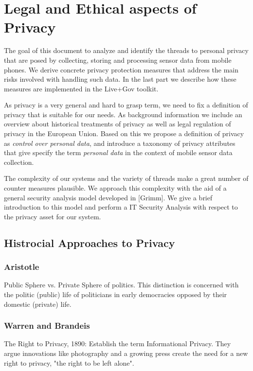 \chapter{Legal and Ethical aspects of Privacy}

The goal of this document to analyze and identify the threads to personal privacy that are posed by collecting, storing and processing sensor data from mobile phones.
We derive concrete privacy protection measures that address the main risks involved with handling such data.
In the last part we describe how these measures are implemented in the Live+Gov toolkit.

As privacy is a very general and hard to grasp term, we need to fix a definition of privacy that is suitable for our needs.
As background information we include an overview about historical treatments of privacy as well as legal regulation of privacy in the European Union.
Based on this we propose a definition of privacy as {\em control over personal data}, and introduce a taxonomy of privacy attributes that give specify the term {\em personal data} in the context of mobile
sensor data collection.

The complexity of our systems and the variety of threads make a great number of counter measures plausible.
We approach this complexity with the aid of a general security analysis model developed in [Grimm].
We give a brief introduction to this model and perform a IT Security Analysis with respect to the privacy asset for our system.

\section{Histrocial Approaches to Privacy}

\subsection{Aristotle}

Public Sphere vs. Private Sphere of politics. This distinction is concerned with the politic (public) life of politicians in early democracies opposed by their domestic (private) life.

\subsection{Warren and Brandeis}

The Right to Privacy, 1890: Establish the term Informational Privacy. They argue innovations like photography and a growing press create the need for a new right to privacy, "the right to be left alone".

